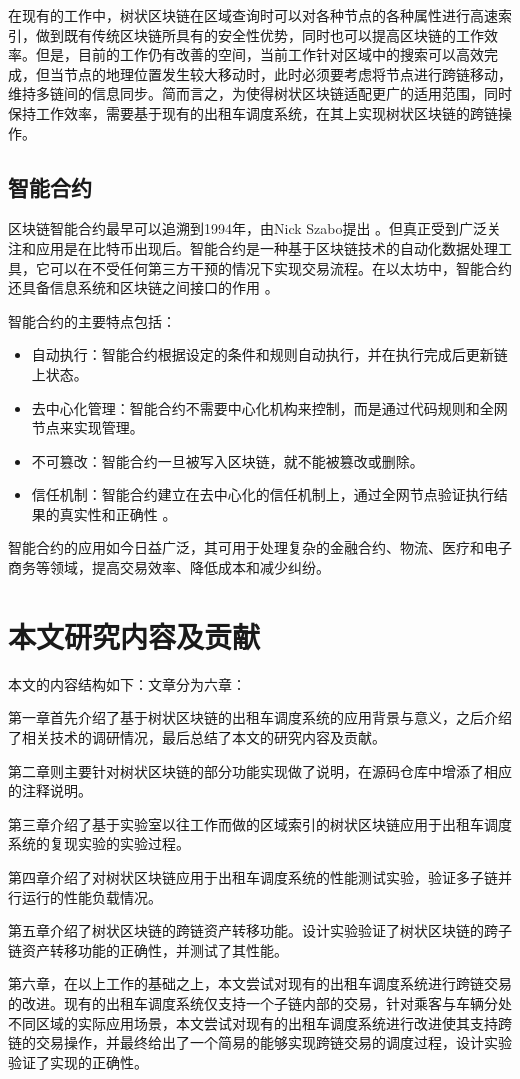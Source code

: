 在现有的工作中，树状区块链在区域查询时可以对各种节点的各种属性进行高速索引，做到既有传统区块链所具有的安全性优势，同时也可以提高区块链的工作效率。但是，目前的工作仍有改善的空间，当前工作针对区域中的搜索可以高效完成，但当节点的地理位置发生较大移动时，此时必须要考虑将节点进行跨链移动，维持多链间的信息同步。简而言之，为使得树状区块链适配更广的适用范围，同时保持工作效率，需要基于现有的出租车调度系统，在其上实现树状区块链的跨链操作。

\subsection{智能合约}

区块链智能合约最早可以追溯到1994年，由Nick Szabo提出 。但真正受到广泛关注和应用是在比特币出现后。智能合约是一种基于区块链技术的自动化数据处理工具，它可以在不受任何第三方干预的情况下实现交易流程。在以太坊中，智能合约还具备信息系统和区块链之间接口的作用 。

智能合约的主要特点包括：
\begin{itemize}
    \item 自动执行：智能合约根据设定的条件和规则自动执行，并在执行完成后更新链上状态。
    \item 去中心化管理：智能合约不需要中心化机构来控制，而是通过代码规则和全网节点来实现管理。
    \item 不可篡改：智能合约一旦被写入区块链，就不能被篡改或删除。
    \item 信任机制：智能合约建立在去中心化的信任机制上，通过全网节点验证执行结果的真实性和正确性 。
\end{itemize}

智能合约的应用如今日益广泛，其可用于处理复杂的金融合约、物流、医疗和电子商务等领域，提高交易效率、降低成本和减少纠纷。 

\section{本文研究内容及贡献}

本文的内容结构如下：文章分为六章：

第一章首先介绍了基于树状区块链的出租车调度系统的应用背景与意义，之后介绍了相关技术的调研情况，最后总结了本文的研究内容及贡献。

第二章则主要针对树状区块链的部分功能实现做了说明，在源码仓库中增添了相应的注释说明。

第三章介绍了基于实验室以往工作而做的区域索引的树状区块链应用于出租车调度系统的复现实验的实验过程。

第四章介绍了对树状区块链应用于出租车调度系统的性能测试实验，验证多子链并行运行的性能负载情况。

第五章介绍了树状区块链的跨链资产转移功能。设计实验验证了树状区块链的跨子链资产转移功能的正确性，并测试了其性能。

第六章，在以上工作的基础之上，本文尝试对现有的出租车调度系统进行跨链交易的改进。现有的出租车调度系统仅支持一个子链内部的交易，针对乘客与车辆分处不同区域的实际应用场景，本文尝试对现有的出租车调度系统进行改进使其支持跨链的交易操作，并最终给出了一个简易的能够实现跨链交易的调度过程，设计实验验证了实现的正确性。


